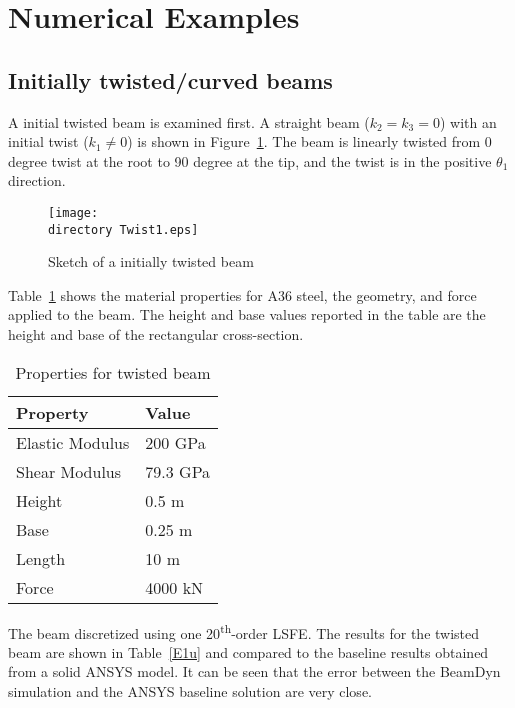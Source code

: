 \documentclass{aiaa-tc}
\def\directory{EPSF/}
\begin{document}
\section{Numerical Examples}

\subsection{Initially twisted/curved beams}

A initial twisted beam is examined first. A straight beam ($k_2=k_3=0$) with an initial twist ($k_1\neq 0$) is shown in Figure~\ref{Twist1}. The beam is linearly twisted from 0 degree twist at the root to 90 degree at the tip, and the twist is in the positive $\theta_1$ direction.
\begin{figure}
\centering
\texttt{[image: \\directory Twist1.eps]}
\caption{Sketch of a initially twisted beam} 
\label{Twist1}
\end{figure}
 Table~\ref{E1Property} shows the material properties for A36 steel, the geometry, and force applied to the beam. The height and base values reported in the table are the height and base of the rectangular cross-section. 
 \begin{table}
\caption{\label{E1Property} Properties for twisted beam}
\begin{center}
    \begin{tabular}{| l | l |}
    	\hline
    	Property               & Value   \\ \hline
    	Elastic Modulus                      & 200 GPa \\ \hline
    	Shear Modulus                      & 79.3 GPa \\ \hline
    	Height                      & 0.5 m   \\ \hline
    	Base                      & 0.25 m  \\ \hline
    	Length                      & 10 m    \\ \hline
    	Force                      & 4000 kN \\ \hline
    \end{tabular}
\end{center}
\end{table}
The beam discretized using one 20\textsuperscript{th}-order LSFE. The results for the twisted beam are shown in Table~\ref{E1u} and compared to the baseline results obtained from a solid ANSYS model. It can be seen that the error between the BeamDyn simulation and the ANSYS baseline solution are very close. 
\end{document}
